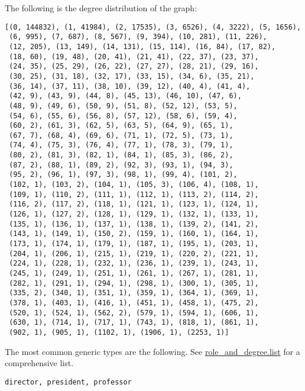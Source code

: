 \documentclass{tufte-handout}
\begin{document}
\begin{enumerate}
The following is the degree distribution of the graph:
\begin{verbatim}
[(0, 144832), (1, 41984), (2, 17535), (3, 6526), (4, 3222), (5, 1656),
 (6, 995), (7, 687), (8, 567), (9, 394), (10, 281), (11, 226),
 (12, 205), (13, 149), (14, 131), (15, 114), (16, 84), (17, 82),
 (18, 60), (19, 48), (20, 41), (21, 41), (22, 37), (23, 37),
 (24, 35), (25, 29), (26, 22), (27, 27), (28, 21), (29, 16),
 (30, 25), (31, 18), (32, 17), (33, 15), (34, 6), (35, 21),
 (36, 14), (37, 11), (38, 10), (39, 12), (40, 4), (41, 4),
 (42, 9), (43, 9), (44, 8), (45, 13), (46, 10), (47, 6),
 (48, 9), (49, 6), (50, 9), (51, 8), (52, 12), (53, 5),
 (54, 6), (55, 6), (56, 8), (57, 12), (58, 6), (59, 4),
 (60, 2), (61, 3), (62, 5), (63, 5), (64, 9), (65, 1),
 (67, 7), (68, 4), (69, 6), (71, 1), (72, 5), (73, 1),
 (74, 4), (75, 3), (76, 4), (77, 1), (78, 3), (79, 1),
 (80, 2), (81, 3), (82, 1), (84, 1), (85, 3), (86, 2),
 (87, 2), (88, 1), (89, 2), (92, 3), (93, 1), (94, 3),
 (95, 2), (96, 1), (97, 3), (98, 1), (99, 4), (101, 2),
 (102, 1), (103, 2), (104, 1), (105, 3), (106, 4), (108, 1),
 (109, 1), (110, 2), (111, 1), (112, 1), (113, 2), (114, 2),
 (116, 2), (117, 2), (118, 1), (121, 1), (123, 1), (124, 1),
 (126, 1), (127, 2), (128, 1), (129, 1), (132, 1), (133, 1),
 (135, 1), (136, 1), (137, 1), (138, 1), (139, 2), (141, 2),
 (143, 1), (149, 1), (150, 2), (159, 1), (160, 1), (164, 1),
 (173, 1), (174, 1), (179, 1), (187, 1), (195, 1), (203, 1),
 (204, 1), (206, 1), (215, 1), (219, 1), (220, 2), (221, 1),
 (224, 1), (228, 1), (232, 1), (236, 1), (239, 1), (243, 1),
 (245, 1), (249, 1), (251, 1), (261, 1), (267, 1), (281, 1),
 (282, 1), (291, 1), (294, 1), (298, 1), (300, 1), (305, 1),
 (335, 2), (340, 1), (351, 1), (359, 1), (364, 1), (369, 1),
 (378, 1), (403, 1), (416, 1), (451, 1), (458, 1), (475, 2),
 (520, 1), (524, 1), (562, 2), (579, 1), (594, 1), (606, 1),
 (630, 1), (714, 1), (717, 1), (743, 1), (818, 1), (861, 1),
 (902, 1), (905, 1), (1102, 1), (1906, 1), (2253, 1)]
\end{verbatim}

The most common generic types are the following. See \href{/Users/pushpendrerastogi/Dropbox/paper/kbvn/no_repo/role_and_degree.list}{role\_and\_degree.list} for a comprehensive list.
\begin{verbatim}
director, president, professor
\end{verbatim}




\end{enumerate}
\end{document}
